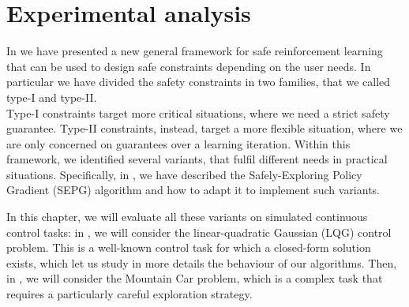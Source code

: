 \chapter{Experimental analysis}
\label{ch:experim}

\fancyhead[LE,RO]{\bfseries\thepage}                               
\fancyhead[RE]{\bfseries\leftmark}    
\fancyhead[LO]{\bfseries\rightmark}  

In  we have presented a new general framework for safe reinforcement learning that can be used to design safe constraints depending on the user needs. In particular we have divided the safety constraints in two families, that we called type-I and type-II.\\ Type-I constraints target more critical situations, where we need a strict safety guarantee. Type-II constraints, instead, target a more flexible situation, where we are only concerned on guarantees over a learning iteration. Within this framework, we identified several variants, that fulfil different needs in practical situations.
Specifically, in , we have described the Safely-Exploring Policy Gradient (SEPG) algorithm and how to adapt it to implement such variants.


In this chapter, we will evaluate all these variants on simulated continuous control tasks: in , we will consider the linear-quadratic Gaussian (LQG) control problem. This is a well-known control task for which a closed-form solution exists, which let us study in more details the behaviour of our algorithms. Then, in , we will consider the Mountain Car problem, which is a complex task that requires a particularly careful exploration strategy. 


